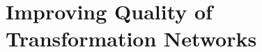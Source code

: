 \part{Improving Quality of Transformation Networks
}




\begin{integrationcontribution}
    
\end{integrationcontribution}


